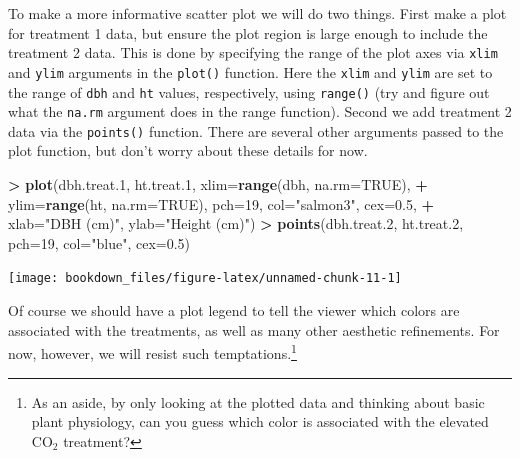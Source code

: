 \documentclass[]{krantz}
\makeatletter
\newenvironment{Shaded}{\begin{snugshade}}{\end{snugshade}}
\newcommand{\KeywordTok}[1]{\textcolor[rgb]{0.27,0.27,0.27}{\textbf{#1}}}
\newcommand{\DataTypeTok}[1]{\textcolor[rgb]{0.27,0.27,0.27}{#1}}
\newcommand{\DecValTok}[1]{\textcolor[rgb]{0.06,0.06,0.06}{#1}}
\newcommand{\FloatTok}[1]{\textcolor[rgb]{0.06,0.06,0.06}{#1}}
\newcommand{\StringTok}[1]{\textcolor[rgb]{0.5,0.5,0.5}{#1}}
\newcommand{\OtherTok}[1]{\textcolor[rgb]{0.37,0.37,0.37}{#1}}
\newcommand{\OperatorTok}[1]{\textcolor[rgb]{0.43,0.43,0.43}{\textbf{#1}}}
\newcommand{\NormalTok}[1]{#1}
\newenvironment{kframe}{%
\medskip{}
\setlength{\fboxsep}{.8em}
 \def\at@end@of@kframe{}%
 \ifinner\ifhmode%
  \def\at@end@of@kframe{\end{minipage}}%
  \begin{minipage}{\columnwidth}%
 \fi\fi%
 \def\FrameCommand##1{\hskip\@totalleftmargin \hskip-\fboxsep
 \colorbox{shadecolor}{##1}\hskip-\fboxsep
     \hskip-\linewidth \hskip-\@totalleftmargin \hskip\columnwidth}%
 \MakeFramed {\advance\hsize-\width
   \@totalleftmargin\z@ \linewidth\hsize
   \@setminipage}}%
 {\par\unskip\endMakeFramed%
 \at@end@of@kframe}
\renewenvironment{Shaded}{\begin{kframe}}{\end{kframe}}
\theoremstyle{definition}
\theoremstyle{definition}
\theoremstyle{definition}
\theoremstyle{remark}
\makeatother
\begin{document}
To make a more informative scatter plot we will do two things. First
make a plot for treatment 1 data, but ensure the plot region is large
enough to include the treatment 2 data. This is done by specifying the
range of the plot axes via \texttt{xlim} and \texttt{ylim} arguments in
the \texttt{plot()} function. Here the \texttt{xlim} and \texttt{ylim}
are set to the range of \texttt{dbh} and \texttt{ht} values,
respectively, using \texttt{range()} (try and figure out what the
\texttt{na.rm} argument does in the range function). Second we add
treatment 2 data via the \texttt{points()} function. There are several
other arguments passed to the plot function, but don't worry about these
details for now.

\begin{Shaded}
\begin{Highlighting}[]
\OperatorTok{>}\StringTok{ }\KeywordTok{plot}\NormalTok{(dbh.treat.}\DecValTok{1}\NormalTok{, ht.treat.}\DecValTok{1}\NormalTok{, }\DataTypeTok{xlim=}\KeywordTok{range}\NormalTok{(dbh, }\DataTypeTok{na.rm=}\OtherTok{TRUE}\NormalTok{), }
\OperatorTok{+}\StringTok{      }\DataTypeTok{ylim=}\KeywordTok{range}\NormalTok{(ht, }\DataTypeTok{na.rm=}\OtherTok{TRUE}\NormalTok{), }\DataTypeTok{pch=}\DecValTok{19}\NormalTok{, }\DataTypeTok{col=}\StringTok{"salmon3"}\NormalTok{, }\DataTypeTok{cex=}\FloatTok{0.5}\NormalTok{, }
\OperatorTok{+}\StringTok{      }\DataTypeTok{xlab=}\StringTok{"DBH (cm)"}\NormalTok{, }\DataTypeTok{ylab=}\StringTok{"Height (cm)"}\NormalTok{)}
\OperatorTok{>}\StringTok{ }\KeywordTok{points}\NormalTok{(dbh.treat.}\DecValTok{2}\NormalTok{, ht.treat.}\DecValTok{2}\NormalTok{, }\DataTypeTok{pch=}\DecValTok{19}\NormalTok{, }\DataTypeTok{col=}\StringTok{"blue"}\NormalTok{, }\DataTypeTok{cex=}\FloatTok{0.5}\NormalTok{)}
\end{Highlighting}
\end{Shaded}

\begin{center}\texttt{[image: bookdown\_files/figure-latex/unnamed-chunk-11-1]} \end{center}

Of course we should have a plot legend to tell the viewer which colors
are associated with the treatments, as well as many other aesthetic
refinements. For now, however, we will resist such
temptations.\footnote{As an aside, by only looking at the plotted data
  and thinking about basic plant physiology, can you guess which color
  is associated with the elevated CO\(_2\) treatment?}
\end{document}

